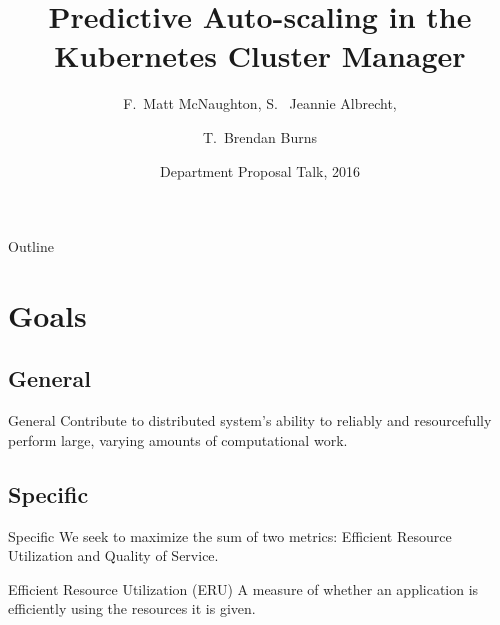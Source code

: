 \documentclass{beamer}
\title{Predictive Auto-scaling in the Kubernetes Cluster Manager}
\author{F.~Matt McNaughton\inst{1}, S. ~Jeannie Albrecht\inst{1}, \and
  T.~Brendan Burns\inst{2}}
\institute[Williams College] %
{
  \inst{1}%
  Department of Computer Science\\
  Williams College
  \and
  \inst{2}%
  Lead Engineer for Kubernetes\\
  Google}
\date{Department Proposal Talk, 2016}
\begin{document}
\begin{frame}
  \titlepage
\end{frame}

\begin{frame}[allowframebreaks]{Outline}
  \tableofcontents
\end{frame}

\section{Goals}

\subsection{General}

\begin{frame}{General}
  Contribute to distributed system's ability to reliably and resourcefully
  perform large, varying amounts of computational work.

\end{frame}

\subsection{Specific}

\begin{frame}{Specific}
  We seek to maximize the sum of two metrics: Efficient Resource Utilization and
  Quality of Service.
\end{frame}

\begin{frame}{Efficient Resource Utilization (ERU)}
  A measure of whether an application is efficiently using the resources it is
  given.



\end{frame}
\end{document}
